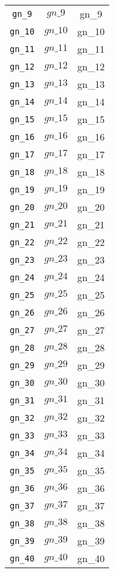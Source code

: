 \begin{center}
\begin{longtable}{ccc}
\texttt{gn\_9} & $gn\_9$ & gn\_9\\
\texttt{gn\_10} & $gn\_10$ & gn\_10\\
\texttt{gn\_11} & $gn\_11$ & gn\_11\\
\texttt{gn\_12} & $gn\_12$ & gn\_12\\
\texttt{gn\_13} & $gn\_13$ & gn\_13\\
\texttt{gn\_14} & $gn\_14$ & gn\_14\\
\texttt{gn\_15} & $gn\_15$ & gn\_15\\
\texttt{gn\_16} & $gn\_16$ & gn\_16\\
\texttt{gn\_17} & $gn\_17$ & gn\_17\\
\texttt{gn\_18} & $gn\_18$ & gn\_18\\
\texttt{gn\_19} & $gn\_19$ & gn\_19\\
\texttt{gn\_20} & $gn\_20$ & gn\_20\\
\texttt{gn\_21} & $gn\_21$ & gn\_21\\
\texttt{gn\_22} & $gn\_22$ & gn\_22\\
\texttt{gn\_23} & $gn\_23$ & gn\_23\\
\texttt{gn\_24} & $gn\_24$ & gn\_24\\
\texttt{gn\_25} & $gn\_25$ & gn\_25\\
\texttt{gn\_26} & $gn\_26$ & gn\_26\\
\texttt{gn\_27} & $gn\_27$ & gn\_27\\
\texttt{gn\_28} & $gn\_28$ & gn\_28\\
\texttt{gn\_29} & $gn\_29$ & gn\_29\\
\texttt{gn\_30} & $gn\_30$ & gn\_30\\
\texttt{gn\_31} & $gn\_31$ & gn\_31\\
\texttt{gn\_32} & $gn\_32$ & gn\_32\\
\texttt{gn\_33} & $gn\_33$ & gn\_33\\
\texttt{gn\_34} & $gn\_34$ & gn\_34\\
\texttt{gn\_35} & $gn\_35$ & gn\_35\\
\texttt{gn\_36} & $gn\_36$ & gn\_36\\
\texttt{gn\_37} & $gn\_37$ & gn\_37\\
\texttt{gn\_38} & $gn\_38$ & gn\_38\\
\texttt{gn\_39} & $gn\_39$ & gn\_39\\
\texttt{gn\_40} & $gn\_40$ & gn\_40\\
\hline%
\end{longtable}
\end{center}
